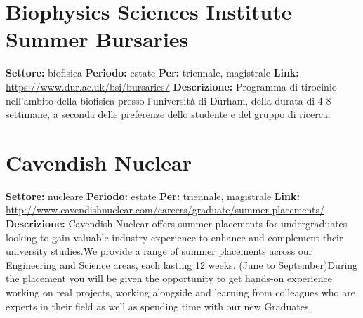 \documentclass[a4paper,10pt]{article}
\begin{document}
\section{Biophysics Sciences Institute Summer Bursaries}
\textbf{Settore:} biofisica\newline
\textbf{Periodo:} estate \newline
\textbf{Per:} triennale, magistrale\newline
\textbf{Link:} \url{https://www.dur.ac.uk/bsi/bursaries/} \newline
\textbf{Descrizione:} Programma di tirocinio nell'ambito della biofisica presso l'università di Durham, della durata di 4-8 settimane, a seconda delle preferenze dello studente e del gruppo di ricerca. 

\section{Cavendish Nuclear}
\textbf{Settore:} nucleare\newline
\textbf{Periodo:} estate \newline
\textbf{Per:} triennale, magistrale\newline
\textbf{Link:} \url{http://www.cavendishnuclear.com/careers/graduate/summer-placements/} \newline
\textbf{Descrizione:} Cavendish Nuclear offers summer placements for undergraduates looking to gain valuable industry experience to enhance and complement their university studies.We provide a range of summer placements  across our Engineering and Science areas, each lasting 12 weeks. (June to September)During the placement you will be given the opportunity to get hands-on experience working on real projects, working  alongside and learning from colleagues who are experts in their field as well as spending time with our new Graduates.  
\end{document}
